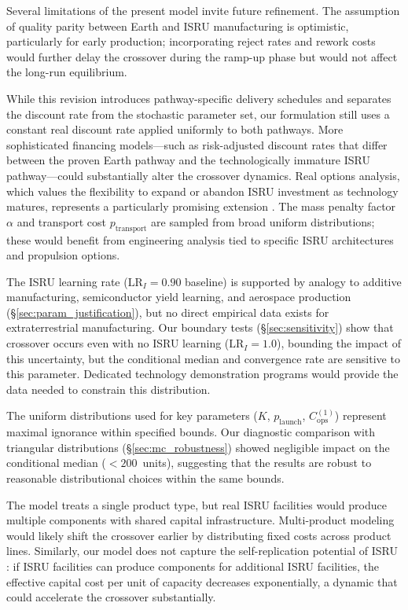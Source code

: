 \documentclass[preprint,12pt]{elsarticle}
\begin{document}
Several limitations of the present model invite future refinement. The assumption of quality parity between Earth and ISRU manufacturing is optimistic, particularly for early production; incorporating reject rates and rework costs would further delay the crossover during the ramp-up phase but would not affect the long-run equilibrium.

While this revision introduces pathway-specific delivery schedules and separates the discount rate from the stochastic parameter set, our formulation still uses a constant real discount rate applied uniformly to both pathways. More sophisticated financing models---such as risk-adjusted discount rates that differ between the proven Earth pathway and the technologically immature ISRU pathway---could substantially alter the crossover dynamics. Real options analysis, which values the flexibility to expand or abandon ISRU investment as technology matures, represents a particularly promising extension \cite{sowers2021}. The mass penalty factor $\alpha$ and transport cost $p_{\mathrm{transport}}$ are sampled from broad uniform distributions; these would benefit from engineering analysis tied to specific ISRU architectures and propulsion options.

The ISRU learning rate ($\mathrm{LR}_I = 0.90$ baseline) is supported by analogy to additive manufacturing, semiconductor yield learning, and aerospace production (\S\ref{sec:param_justification}), but no direct empirical data exists for extraterrestrial manufacturing. Our boundary tests (\S\ref{sec:sensitivity}) show that crossover occurs even with no ISRU learning ($\mathrm{LR}_I = 1.0$), bounding the impact of this uncertainty, but the conditional median and convergence rate are sensitive to this parameter. Dedicated technology demonstration programs would provide the data needed to constrain this distribution.

The uniform distributions used for key parameters ($K$, $p_{\mathrm{launch}}$, $C_{\mathrm{ops}}^{(1)}$) represent maximal ignorance within specified bounds. Our diagnostic comparison with triangular distributions (\S\ref{sec:mc_robustness}) showed negligible impact on the conditional median ($<200$~units), suggesting that the results are robust to reasonable distributional choices within the same bounds.

The model treats a single product type, but real ISRU facilities would produce multiple components with shared capital infrastructure. Multi-product modeling would likely shift the crossover earlier by distributing fixed costs across product lines. Similarly, our model does not capture the self-replication potential of ISRU \cite{metzger2013}: if ISRU facilities can produce components for additional ISRU facilities, the effective capital cost per unit of capacity decreases exponentially, a dynamic that could accelerate the crossover substantially.
\end{document}

